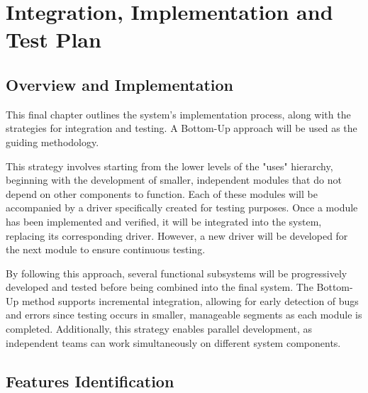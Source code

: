 \chapter{Integration, Implementation and Test Plan}

\section{Overview and Implementation}

This final chapter outlines the system's implementation process, along with the strategies for integration and testing. A Bottom-Up approach will be used as the guiding methodology.

This strategy involves starting from the lower levels of the "uses" hierarchy, beginning with the development of smaller, independent modules that do not depend on other components to function. Each of these modules will be accompanied by a driver specifically created for testing purposes. Once a module has been implemented and verified, it will be integrated into the system, replacing its corresponding driver. However, a new driver will be developed for the next module to ensure continuous testing.

By following this approach, several functional subsystems will be progressively developed and tested before being combined into the final system. The Bottom-Up method supports incremental integration, allowing for early detection of bugs and errors since testing occurs in smaller, manageable segments as each module is completed. Additionally, this strategy enables parallel development, as independent teams can work simultaneously on different system components.

\section{Features Identification}

